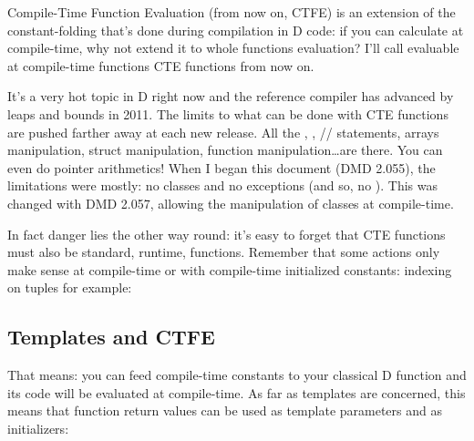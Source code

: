 Compile-Time Function Evaluation
(from now on, CTFE) is an extension of the constant-folding that's done during compilation in D code: if you can calculate  at compile-time, why not extend it to whole functions evaluation? I'll call evaluable at compile-time functions CTE functions from now on.

It's a very hot topic in D right now and the reference compiler has advanced by leaps and bounds in 2011. The limits to what can be done with CTE functions are pushed farther away at each new release.  All the , , // statements, arrays manipulation, struct manipulation, function manipulation\ldots are there. You can even do pointer arithmetics! When I began this document (DMD 2.055), the limitations were mostly: no classes and no exceptions (and so, no ). This was changed with DMD 2.057, allowing the manipulation of classes at compile-time.

In fact danger lies the other way round: it's easy to forget that CTE functions must also be standard, runtime, functions. Remember that some actions only make sense at compile-time or with compile-time initialized constants: indexing on tuples for example:

\subsection{\texorpdfstring{}
                           {\_\_ctfe}}


\subsection{Templates and CTFE} \label{templatesandctfe}


That means: you can feed compile-time constants to your classical D function and its code will be evaluated at compile-time. As far as templates are concerned, this means that function return values can be used as template parameters and as  initializers:

\begin{dcode}

\end{dcode}

